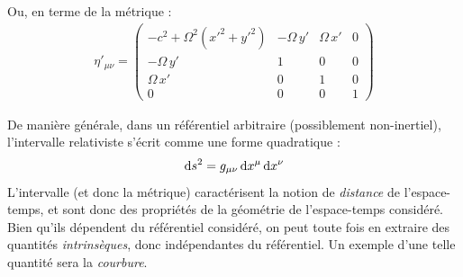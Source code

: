 {\begin{exmp}
\begin{equation}
    \end{equation}
    Ou, en terme de la métrique :
    \begin{align}
        \eta'_{\mu\nu} = \begin{pmatrix}
            - c^2 + \Omega^2 (x'^2 + y'^2) & - \Omega \, y' & \Omega \, x' & 0 \\
            - \Omega \, y' & 1 & 0 & 0\\
            \Omega \, x' & 0 & 1 & 0\\
            0 & 0 & 0 & 1
        \end{pmatrix}
    \end{align}
\end{exmp}
\cutebreak
De manière générale, dans un référentiel arbitraire (possiblement non-inertiel), l'intervalle relativiste s'écrit comme une forme quadratique :
\begin{equation}
    \mathrm{d} s^2 = g_{\mu\nu}\, \mathrm{d} x^\mu \, \mathrm{d} x^\nu
\end{equation}
L'intervalle (et donc la métrique) caractérisent la notion de \emph{distance} de l'espace-temps, et sont donc des propriétés de la géométrie de l'espace-temps considéré. Bien qu'ils dépendent du référentiel considéré, on peut toute fois en extraire des quantités \emph{intrinsèques}, donc indépendantes du référentiel. Un exemple d'une telle quantité sera la \emph{courbure}. 
}
